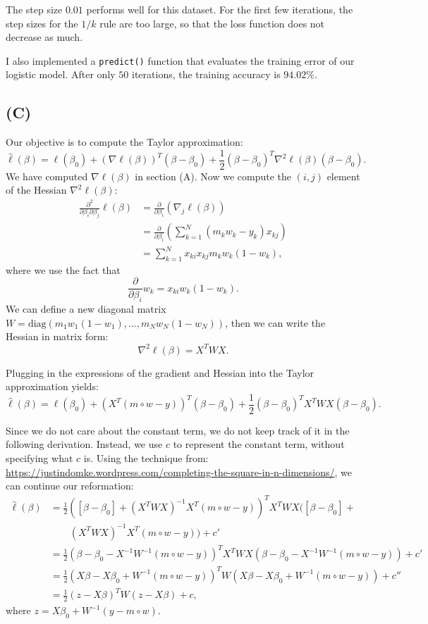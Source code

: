\documentclass[a4paper,11pt]{article}
\begin{document}
The step size $0.01$ performs well for this dataset. For the first few iterations, the step sizes for the $1/k$ rule are too large, so that the loss function does not decrease as much.

I also implemented a \texttt{predict()} function that evaluates the training error of our logistic model. After only $50$ iterations, the training accuracy is $94.02\%$. 

\subsection{(C)}
Our objective is to compute the Taylor approximation:
$$
\hat{\ell}(\beta) = \ell(\beta_0)+(\nabla \ell(\beta))^T(\beta-\beta_0) + \frac{1}{2}(\beta-\beta_0)^T \nabla^2 \ell(\beta) (\beta-\beta_0).
$$
We have computed $\nabla \ell(\beta)$ in section (A). Now we compute the $(i,j)$ element of the Hessian $\nabla^2 \ell(\beta)$:
\begin{align}
		\frac{\partial^2}{\partial \beta_i \partial \beta _j}\ell (\beta) 
		&= \frac{\partial}{\partial \beta_i} \left ( \nabla_j \ell(\beta) \right ) \\
		&= \frac{\partial}{\partial \beta_i} \left ( \sum_{k=1}^N(m_kw_k-y_k)x_{kj} \right )  \\
		&= \sum_{k=1}^{N} x_{ki}x_{kj}m_k w_k(1-w_k),
	\end{align}
where we use the fact that 
$$
		\frac{\partial}{\partial \beta_i} w_k = x_{ki} w_k(1-w_k).
$$
We can define a new diagonal matrix $W = \text{diag}(m_1w_1(1-w_1),\ldots, m_Nw_N(1-w_N))$, then we can write the Hessian in matrix form:
$$
\nabla^2 \ell(\beta) = X^TWX.
$$

Plugging in the expressions of the gradient and Hessian into the Taylor approximation yields:
$$
\hat{\ell}(\beta) = \ell(\beta_0) + (X^T(m\circ w-y))^T(\beta - \beta_0) + \frac{1}{2}(\beta - \beta_0)^T X^T W X (\beta - \beta_0).
		$$
		
Since we do not care about the constant term, we do not keep track of it in the following derivation. Instead, we use $c$ to represent the constant term, without specifying what $c$ is. Using the technique from: \url{https://justindomke.wordpress.com/completing-the-square-in-n-dimensions/}, we can continue our reformation:
\small
\begin{align*}
		\hat{\ell}(\beta) 
		&= \frac{1}{2} ( [ \beta - \beta_0 ] +(X^T W X)^{-1} X^T (m\circ w-y) )^T X^T W X ( [ \beta - \beta_0 ] +\\
		& \quad \quad (X^T W X)^{-1} X^T (m\circ w-y) ) + c' \\ 
		&= \frac{1}{2} (\beta - \beta_0 - X^{-1}W^{-1} (m\circ w-y) )^T X^T W X (\beta - \beta_0 - X^{-1}W^{-1} (m\circ w-y) ) + c' \\
		&= \frac{1}{2} (X\beta - X\beta_0 + W^{-1} (m\circ w-y) )^T W (X\beta - X\beta_0 + W^{-1} (m\circ w-y) ) + c'' \\
		&= \frac{1}{2}(z-X\beta)^T W (z-X\beta) + c,
	\end{align*}
where $z = X\beta_0 + W^{-1}(y-m\circ w)$.
\end{document}
